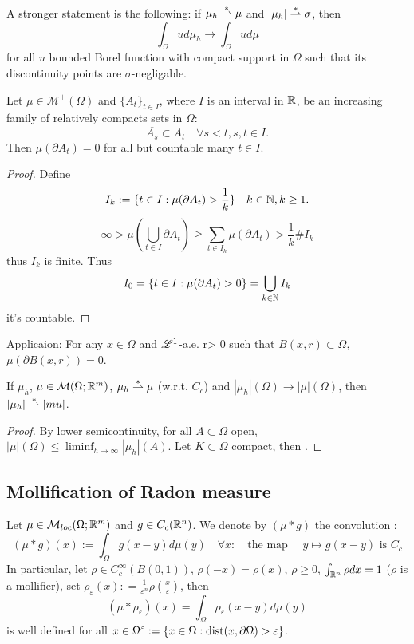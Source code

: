 \begin{remark}
A stronger statement is the following: if $\mu_h \stackrel {*}{\rightharpoonup} \mu$ and $|\mu_h|
\stackrel {*}{\rightharpoonup} \sigma$, then
\[
\int_\Omega u d\mu_h \to \int_\Omega u d\mu
\]
for all $u$ bounded Borel function with compact support in $\Omega$ such that
	its discontinuity points are $\sigma$-negligable.
\end{remark}
\begin{remark}
Let $\mu \in \mathcal{M}^+(\Omega)$ and $\{A_t\}_{t\in I}$, where $I$ is an
interval in $\mathbb{R}$, be an increasing family of relatively compacts sets in
$\Omega$:
\[
\overline{A_s} \subset A_t \quad \forall s < t, s,t \in I.
\]
Then $\mu(\partial A_t) = 0$ for all but countable many $t \in I$.
\begin{proof}
Define 
\[
I_k := \{ t \in I : \mu(\partial A_t) > \frac{1}{k}\} \quad k\in\mathbb{N}, k \geq 1.
\]
\[
\infty > \mu\left(\bigcup_{t \in I} \partial A_t\right) \geq \sum_{t \in I_k}
\mu (\partial A_t) > \frac{1}{k} \# I_k
\]
thus $I_k$ is finite. Thus 
\[
I_0 = \{t \in I : \mu(\partial A_t) > 0 \} = \bigcup_{k\in \mathbb{N}} I_k
\]
it's countable.
\end{proof}
Applicaion: For any $x \in \Omega$ and $\mathscr{L}^{1}$-a.e. r> 0 such that $B(x,r) \subset
\Omega$, $\mu(\partial B(x,r)) = 0$.
\end{remark}

\begin{proposition}
If $\mu_h$, $\mu \in \mathcal{M}(\Omega;\mathbb{R}^m)$, $\mu_h \stackrel {*}{\rightharpoonup} \mu$ (w.r.t.
$C_c$) and $|\mu_h|(\Omega) \to |\mu|(\Omega)$, then $|\mu_h| \stackrel {*}{\rightharpoonup} |mu|$.
\end{proposition}
\begin{proof}
By lower semicontinuity, for all $A \subset \Omega$ open, $|\mu|(\Omega) \leq
\liminf_{h\to \infty} |\mu_h|(A)$.
Let $K \subset \Omega$ compact, then \TODO.
\end{proof}

\subsection{Mollification of Radon measure}

Let $\mu \in \mathcal{M}_{loc}(\Omega;\mathbb{R}^m)$ and $g \in C_c(\mathbb{R}^n)$.
We denote by $(\mu * g)$ the convolution :
\[
(\mu * g)(x) := \int_\Omega g(x-y) d\mu(y)
\quad \forall x:
\quad \text{the map $\quad y \mapsto g(x-y)$ is $C_c$}
\]
In particular, let $\rho \in C^\infty_c (B(0,1))$, $\rho(-x)= \rho(x)$, $\rho
\geq 0$, $\int_{\mathbb{R}^n} \rho dx  = 1$ ($\rho$ is a mollifier), set
$\rho_\varepsilon(x) : = \frac{1}{\varepsilon^n} \rho(\frac{x}{\varepsilon})$,
then  
\[
(\mu * \rho_\varepsilon)(x) = \int_\Omega \rho_\varepsilon(x-y) d\mu(y)
\]
is well defined for all $x \in \Omega^\varepsilon := \{x \in \Omega:
\operatorname{dist}(x,\partial \Omega) > \varepsilon\}$. 

